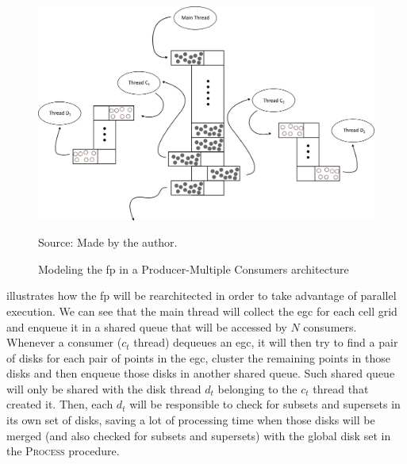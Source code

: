 \begin{figure}[h!]
    \centering
    \caption{Modeling the \ac{fp} in a Producer-Multiple Consumers architecture}
    \centerline{\includegraphics[width=\linewidth]{images/multithread.png}}
    \footnotesize{Source: Made by the author.}
    \label{fig:multithread}
\end{figure}

 illustrates how the \ac{fp} will be rearchitected in order to take advantage of parallel
execution.  We can see that the main thread will collect the \ac{egc} for each cell grid and enqueue it in a shared
queue that will be accessed by $N$ consumers. Whenever a consumer ($c_t$ thread) dequeues an \ac{egc}, it will then try
to find a pair of disks for each pair of points in the \ac{egc}, cluster the remaining points in those disks and then
enqueue those disks in another shared queue. Such shared queue will only be shared with the disk thread $d_t$ belonging
to the $c_t$ thread that created it. Then, each $d_t$ will be responsible to check for subsets and supersets in its own
set of disks, saving a lot of processing time when those disks will be merged (and also checked for subsets and
supersets) with the global disk set in the \textsc{Process} procedure.
